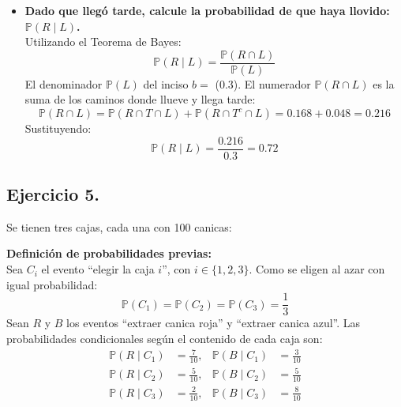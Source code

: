 \documentclass[10pt,a4paper]{book}
\begin{document}
\begin{itemize}
\begin{center}
\begin{tikzpicture}
\end{tikzpicture}
\end{center}

\vspace{0.2cm}
    
    \begin{align*}
        \mathbb{P}(L) &= \mathbb{P}(R \cap T \cap L) + \mathbb{P}(R \cap T^c \cap L) + \mathbb{P}(R^c \cap T \cap L) + \mathbb{P}(R^c \cap T^c \cap L) \\
        &= \mathbb{P}(R)\mathbb{P}(T \mid R)\mathbb{P}(L \mid R, T) \\
        &\quad + \mathbb{P}(R)\mathbb{P}(T^c \mid R)\mathbb{P}(L \mid R, T^c) \\
        &\quad + \mathbb{P}(R^c)\mathbb{P}(T \mid R^c)\mathbb{P}(L \mid R^c, T) \\
        &\quad + \mathbb{P}(R^c)\mathbb{P}(T^c \mid R^c)\mathbb{P}(L \mid R^c, T^c) \\
        &= (0.4)(0.6)(0.7) + (0.4)(0.4)(0.3) + (0.6)(0.2)(0.3) + (0.6)(0.8)(0.1) \\
        &= 0.168 + 0.048 + 0.036 + 0.048 \\
        &= 0.3
    \end{align*}

    \item[\textbf{c)}] \textbf{Dado que llegó tarde, calcule la probabilidad de que haya llovido: $\mathbb{P}(R \mid L)$.} \\
    Utilizando el Teorema de Bayes:
    \[ \mathbb{P}(R \mid L) = \frac{\mathbb{P}(R \cap L)}{\mathbb{P}(L)} \]
    El denominador $\mathbb{P}(L)$ del inciso $b=$ ($0.3$). El numerador $\mathbb{P}(R \cap L)$ es la suma de los caminos donde llueve y llega tarde:
    \[ \mathbb{P}(R \cap L) = \mathbb{P}(R \cap T \cap L) + \mathbb{P}(R \cap T^c \cap L) = 0.168 + 0.048 = 0.216 \]
    Sustituyendo:
    \[ \mathbb{P}(R \mid L) = \frac{0.216}{0.3} = 0.72 \]
\end{itemize}

\newpage

\subsection{Ejercicio 5.} Se tienen tres cajas, cada una con 100 canicas:

\textbf{Definición de probabilidades previas:} \\
Sea $C_i$ el evento ``elegir la caja $i$'', con $i \in \{1, 2, 3\}$. Como se eligen al azar con igual probabilidad:
\[ \mathbb{P}(C_1) = \mathbb{P}(C_2) = \mathbb{P}(C_3) = \frac{1}{3} \]
Sean $R$ y $B$ los eventos ``extraer canica roja'' y ``extraer canica azul''. Las probabilidades condicionales según el contenido de cada caja son:
\begin{align*}
    \mathbb{P}(R \mid C_1) &= \frac{7}{10}, & \mathbb{P}(B \mid C_1) &= \frac{3}{10} \\
    \mathbb{P}(R \mid C_2) &= \frac{5}{10}, & \mathbb{P}(B \mid C_2) &= \frac{5}{10} \\
    \mathbb{P}(R \mid C_3) &= \frac{2}{10}, & \mathbb{P}(B \mid C_3) &= \frac{8}{10}
\end{align*}
\end{document}
